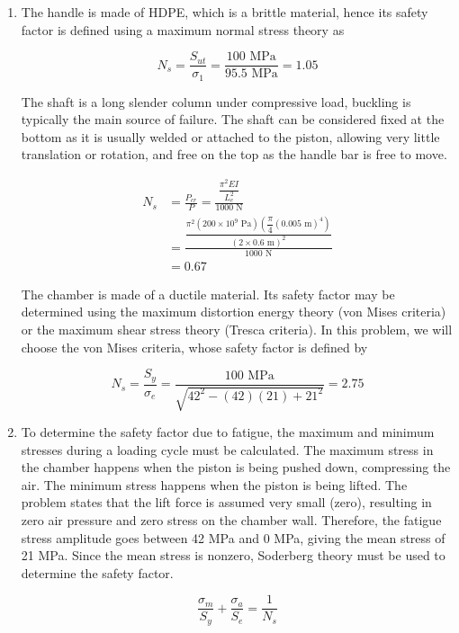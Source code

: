 \documentclass[a4paper,openany,12pt]{book}
\begin{document}
{{\begin{enumerate}
\begin{enumerate}
Note that there are no shear stresses in any of the component,
therefore the normal stresses found are also principal stresses.

\item The handle is made of HDPE, which is a brittle material, hence its
safety factor is defined using a maximum normal stress theory as

$$N_s = \frac{S_{ut}}{\sigma_1} = \frac{100\text{ MPa}}{95.5\text{ MPa}} = 1.05$$

The shaft is a long slender column under compressive load, buckling
is typically the main source of failure. The shaft can be considered
fixed at the bottom as it is usually welded or attached to the
piston, allowing very little translation or rotation, and free on the
top as the handle bar is free to move.

$$\begin{aligned}
     N_s &= \frac{P_{cr}}{P} = \frac{\dfrac{\pi ^2 EI}{L_e^2}}{1000\text{ N}} \\[0.5em] 
         &= \frac{\dfrac{\pi ^2 (200 \times 10^9 \text{ Pa}) \left( \dfrac{\pi }{4}(0.005\text{ m})^4 \right)}{(2 \times 0.6\text{ m})^2}}{1000\text{ N}} \\[0.5em] 
         &= 0.67\end{aligned}$$

The chamber is made of a ductile material. Its safety factor may be
determined using the maximum distortion energy theory (von Mises
criteria) or the maximum shear stress theory (Tresca criteria). In
this problem, we will choose the von Mises criteria, whose safety
factor is defined by

$$N_s = \frac{S_y}{\sigma_e} = \frac{100\text{ MPa}}{\sqrt {42^2 - (42)(21) + 21^2}} = 2.75$$

\item To determine the safety factor due to fatigue, the maximum and
minimum stresses during a loading cycle must be calculated. The
maximum stress in the chamber happens when the piston is being pushed
down, compressing the air. The minimum stress happens when the piston
is being lifted. The problem states that the lift force is assumed
very small (zero), resulting in zero air pressure and zero stress on
the chamber wall. Therefore, the fatigue stress amplitude goes
between 42 MPa and 0 MPa, giving the mean stress of 21 MPa. Since the
mean stress is nonzero, Soderberg theory must be used to determine
the safety factor.

$$\frac{\sigma _m}{S_y} + \frac{\sigma _a}{S_e} = \frac{1}{N_s}$$


\end{enumerate}
\end{enumerate}}}
\end{document}
